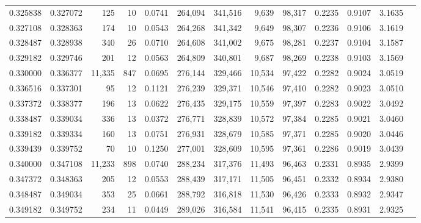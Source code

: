 \begin{tabular}{rrrrrrrrrrrrr}
0.325838 & 0.327072 &    125 &    10 &                                     0.0741 & 264,094 & 341,516 &   9,639 &  98,317 & 0.2235 & 0.9107 & 3.1635 \\
0.327108 & 0.328363 &    174 &    10 &                                     0.0543 & 264,268 & 341,342 &   9,649 &  98,307 & 0.2236 & 0.9106 & 3.1619 \\
0.328487 & 0.328938 &    340 &    26 &                                     0.0710 & 264,608 & 341,002 &   9,675 &  98,281 & 0.2237 & 0.9104 & 3.1587 \\
0.329182 & 0.329746 &    201 &    12 &                                     0.0563 & 264,809 & 340,801 &   9,687 &  98,269 & 0.2238 & 0.9103 & 3.1569 \\
0.330000 & 0.336377 & 11,335 &   847 &                                     0.0695 & 276,144 & 329,466 &  10,534 &  97,422 & 0.2282 & 0.9024 & 3.0519 \\
0.336516 & 0.337301 &     95 &    12 &                                     0.1121 & 276,239 & 329,371 &  10,546 &  97,410 & 0.2282 & 0.9023 & 3.0510 \\
0.337372 & 0.338377 &    196 &    13 &                                     0.0622 & 276,435 & 329,175 &  10,559 &  97,397 & 0.2283 & 0.9022 & 3.0492 \\
0.338487 & 0.339034 &    336 &    13 &                                     0.0372 & 276,771 & 328,839 &  10,572 &  97,384 & 0.2285 & 0.9021 & 3.0460 \\
0.339182 & 0.339334 &    160 &    13 &                                     0.0751 & 276,931 & 328,679 &  10,585 &  97,371 & 0.2285 & 0.9020 & 3.0446 \\
0.339439 & 0.339752 &     70 &    10 &                                     0.1250 & 277,001 & 328,609 &  10,595 &  97,361 & 0.2286 & 0.9019 & 3.0439 \\
0.340000 & 0.347108 & 11,233 &   898 &                                     0.0740 & 288,234 & 317,376 &  11,493 &  96,463 & 0.2331 & 0.8935 & 2.9399 \\
0.347372 & 0.348363 &    205 &    12 &                                     0.0553 & 288,439 & 317,171 &  11,505 &  96,451 & 0.2332 & 0.8934 & 2.9380 \\
0.348487 & 0.349034 &    353 &    25 &                                     0.0661 & 288,792 & 316,818 &  11,530 &  96,426 & 0.2333 & 0.8932 & 2.9347 \\
0.349182 & 0.349752 &    234 &    11 &                                     0.0449 & 289,026 & 316,584 &  11,541 &  96,415 & 0.2335 & 0.8931 & 2.9325 \\

\end{tabular}
